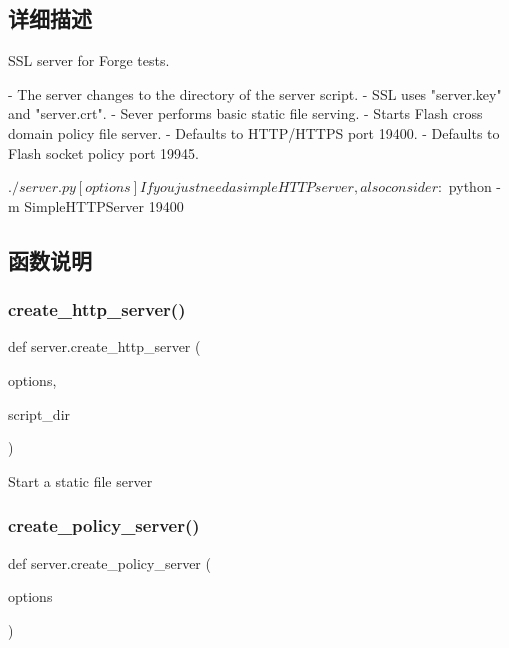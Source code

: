 \subsection{详细描述}
\begin{DoxyVerb}SSL server for Forge tests.

- The server changes to the directory of the server script.
- SSL uses "server.key" and "server.crt".
- Sever performs basic static file serving.
- Starts Flash cross domain policy file server.
- Defaults to HTTP/HTTPS port 19400.
- Defaults to Flash socket policy port 19945.

  $ ./server.py [options]

If you just need a simple HTTP server, also consider:
  $ python -m SimpleHTTPServer 19400
\end{DoxyVerb}
 

\subsection{函数说明}
\mbox{\label{namespaceserver_aa600f791a9d38b43a5425a80925f7516}} 
\subsubsection{\texorpdfstring{create\+\_\+http\+\_\+server()}{create\_http\_server()}}
{\footnotesize\ttfamily def server.\+create\+\_\+http\+\_\+server (\begin{DoxyParamCaption}\item[{}]{options,  }\item[{}]{script\+\_\+dir }\end{DoxyParamCaption})}

\begin{DoxyVerb}Start a static file server\end{DoxyVerb}
 \mbox{\label{namespaceserver_a2789ab523ceef7e25828435e6c51529d}} 
\subsubsection{\texorpdfstring{create\+\_\+policy\+\_\+server()}{create\_policy\_server()}}
{\footnotesize\ttfamily def server.\+create\+\_\+policy\+\_\+server (\begin{DoxyParamCaption}\item[{}]{options }\end{DoxyParamCaption})}

